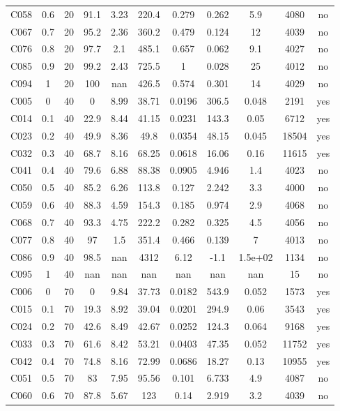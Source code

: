 \begin{longtable}{@{}lcccccccccc@{}}
C058 & 0.6 & 20 & 91.1 & 3.23 & 220.4 & 0.279 & 0.262 & 5.9 & 4080 & no \\
C067 & 0.7 & 20 & 95.2 & 2.36 & 360.2 & 0.479 & 0.124 & 12 & 4039 & no \\
C076 & 0.8 & 20 & 97.7 & 2.1 & 485.1 & 0.657 & 0.062 & 9.1 & 4027 & no \\
C085 & 0.9 & 20 & 99.2 & 2.43 & 725.5 & 1 & 0.028 & 25 & 4012 & no \\
C094 & 1 & 20 & 100 & nan & 426.5 & 0.574 & 0.301 & 14 & 4029 & no \\
C005 & 0 & 40 & 0 & 8.99 & 38.71 & 0.0196 & 306.5 & 0.048 & 2191 & yes \\
C014 & 0.1 & 40 & 22.9 & 8.44 & 41.15 & 0.0231 & 143.3 & 0.05 & 6712 & yes \\
C023 & 0.2 & 40 & 49.9 & 8.36 & 49.8 & 0.0354 & 48.15 & 0.045 & 18504 & yes \\
C032 & 0.3 & 40 & 68.7 & 8.16 & 68.25 & 0.0618 & 16.06 & 0.16 & 11615 & yes \\
C041 & 0.4 & 40 & 79.6 & 6.88 & 88.38 & 0.0905 & 4.946 & 1.4 & 4023 & no \\
C050 & 0.5 & 40 & 85.2 & 6.26 & 113.8 & 0.127 & 2.242 & 3.3 & 4000 & no \\
C059 & 0.6 & 40 & 88.3 & 4.59 & 154.3 & 0.185 & 0.974 & 2.9 & 4068 & no \\
C068 & 0.7 & 40 & 93.3 & 4.75 & 222.2 & 0.282 & 0.325 & 4.5 & 4056 & no \\
C077 & 0.8 & 40 & 97 & 1.5 & 351.4 & 0.466 & 0.139 & 7 & 4013 & no \\
C086 & 0.9 & 40 & 98.5 & nan & 4312 & 6.12 & -1.1 & 1.5e+02 & 1134 & no \\
C095 & 1 & 40 & nan & nan & nan & nan & nan & nan & 15 & no \\
C006 & 0 & 70 & 0 & 9.84 & 37.73 & 0.0182 & 543.9 & 0.052 & 1573 & yes \\
C015 & 0.1 & 70 & 19.3 & 8.92 & 39.04 & 0.0201 & 294.9 & 0.06 & 3543 & yes \\
C024 & 0.2 & 70 & 42.6 & 8.49 & 42.67 & 0.0252 & 124.3 & 0.064 & 9168 & yes \\
C033 & 0.3 & 70 & 61.6 & 8.42 & 53.21 & 0.0403 & 47.35 & 0.052 & 11752 & yes \\
C042 & 0.4 & 70 & 74.8 & 8.16 & 72.99 & 0.0686 & 18.27 & 0.13 & 10955 & yes \\
C051 & 0.5 & 70 & 83 & 7.95 & 95.56 & 0.101 & 6.733 & 4.9 & 4087 & no \\
C060 & 0.6 & 70 & 87.8 & 5.67 & 123 & 0.14 & 2.919 & 3.2 & 4039 & no \\

\end{longtable}
